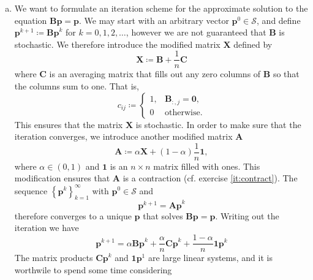 \documentclass[12pt, oneside, article, a4paper]{memoir}
\newcommand{\mat}[1]{\bm{#1}}
\begin{document}
\begin{enumerate}[a)]
    \item We want to formulate an iteration scheme for the approximate solution
        to the equation \( \mat{Bp} = \mat{p} \). We may start with an
        arbitrary vector \( \mat{p}^0 \in \mathcal{S} \), and define \(
        \mat{p}^{k+1}  \coloneqq \mat{Bp}^k \) for \( k = 0, 1, 2, \ldots \),
        however we are not guaranteed that \( \mat{B} \) is stochastic.
        We therefore introduce the modified matrix \( \mat{X} \) defined by
        \begin{equation}
            \mat{X} \coloneqq \mat{B} + \frac{1}{n} \mat{C}
        \end{equation}
        where \( \mat{C} \) is an averaging matrix that fills out any zero
        columns of \( \mat{B} \) so that the columns sum to one. That is,
        \begin{equation}
            c_{ij} \coloneqq \begin{cases}
                1, & \mat{B}_{:, j} = \mat{0},\\
                0 & \text{otherwise}.
            \end{cases}
        \end{equation}
        This ensures that the matrix \( \mat{X} \) is stochastic. In order to
        make sure that the iteration converges, we introduce another modified
        matrix \( \mat{A} \)
        \begin{equation}
            \mat{A} \coloneqq \alpha \mat{X} + (1 - \alpha) \frac{1}{n} \mat{1},
        \end{equation}
        where \( \alpha \in (0, 1)\) and \( \mat{1} \) is an \( n\times n\)
        matrix filled with ones. This modification ensures that \( \mat{A} \)
        is a contraction (cf. exercise \vref{it:contract}).  The sequence \(
        \left\{ \mat{p}^k \right\}_{k=1}^\infty \) with \( \mat{p}^0 \in
        \mathcal{S} \) and
        \begin{equation}
            \mat{p}^{k+1} = \mat{Ap}^k
        \end{equation}
        therefore converges to a unique \( \mat{p} \) that solves \( \mat{Bp} =
        \mat{p} \).  Writing out the iteration we have
        \begin{equation}
            \mat{p}^{k+1} = \alpha \mat{Bp}^k  + \frac{\alpha}{n} \mat{Cp}^k +
            \frac{1 - \alpha}{n} \mat{1p}^k
        \end{equation}
        The matrix products \( \mat{Cp}^k \) and \( \mat{1p}^1 \) are large
        linear systems, and it is worthwile to spend some time considering

\end{enumerate}
\end{document}
